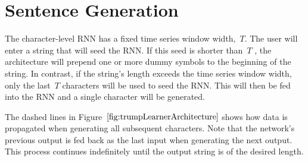 \documentclass{report}
\begin{document}
  \section{Sentence Generation}
  
  The character-level RNN has a fixed time series window width,~$T$.  The user will enter a string that will seed the RNN.  If this seed is shorter than~$T$ , the architecture will prepend one or more dummy symbols to the beginning of the string.  In contrast, if the string's length exceeds the time series window width, only the last~$T$ characters will be used to seed the RNN.  This will then be fed into the RNN and a single character will be generated.
  
  The dashed lines in Figure~$\ref{fig:trumpLearnerArchitecture}$ shows how data is propagated when generating all subsequent characters.  Note that the network's previous output is fed back as the last input when generating the next output.  This process continues indefinitely until the output string is of the desired length.
  
\end{document}
